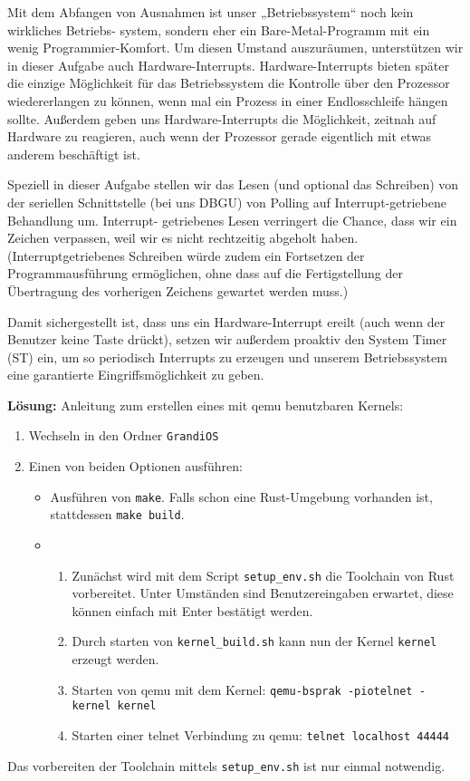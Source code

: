 \begin{description}

Mit dem Abfangen von Ausnahmen ist unser „Betriebssystem“ noch kein wirkliches Betriebs-
system, sondern eher ein Bare-Metal-Programm mit ein wenig Programmier-Komfort. Um 
diesen Umstand auszuräumen, unterstützen wir in dieser Aufgabe auch Hardware-Interrupts. 
Hardware-Interrupts bieten später die einzige Möglichkeit für das Betriebssystem die Kontrolle 
über den Prozessor wiedererlangen zu können, wenn mal ein Prozess in einer Endlosschleife 
hängen sollte. Außerdem geben uns Hardware-Interrupts die Möglichkeit, zeitnah auf Hardware 
zu reagieren, auch wenn der Prozessor gerade eigentlich mit etwas anderem beschäftigt ist. 

Speziell in dieser Aufgabe stellen wir das Lesen (und optional das Schreiben) von der seriellen 
Schnittstelle (bei uns DBGU) von Polling auf Interrupt-getriebene Behandlung um. Interrupt-
getriebenes Lesen verringert die Chance, dass wir ein Zeichen verpassen, weil wir es nicht 
rechtzeitig abgeholt haben. (Interruptgetriebenes Schreiben würde zudem ein Fortsetzen der 
Programmausführung ermöglichen, ohne dass auf die Fertigstellung der Übertragung des 
vorherigen Zeichens gewartet werden muss.) 

Damit sichergestellt ist, dass uns ein Hardware-Interrupt ereilt (auch wenn der Benutzer keine 
Taste drückt), setzen wir außerdem proaktiv den System Timer (ST) ein, um so periodisch 
Interrupts zu erzeugen und unserem Betriebssystem eine garantierte Eingriffsmöglichkeit zu 
geben. 
  

\pagebreak
\textbf{Lösung:}
Anleitung zum erstellen eines mit qemu benutzbaren Kernels:
\begin{enumerate}
	\item Wechseln in den Ordner \texttt{GrandiOS}
        \item Einen von beiden Optionen ausführen:
          \begin{itemize}
            \item Ausführen von \texttt{make}. Falls schon eine Rust-Umgebung vorhanden ist, stattdessen \texttt{make build}.
            \item \begin{enumerate}
              \item Zunächst wird mit dem Script \texttt{setup\_env.sh} die Toolchain von Rust vorbereitet. Unter Umständen sind Benutzereingaben erwartet, diese können einfach mit Enter bestätigt werden.
              \item Durch starten von \texttt{kernel\_build.sh} kann nun der Kernel \texttt{kernel} erzeugt werden.
              \item Starten von qemu mit dem Kernel: \texttt{qemu-bsprak -piotelnet -kernel kernel}
              \item Starten einer telnet Verbindung zu qemu: \texttt{telnet localhost 44444}
            \end{enumerate}
          \end{itemize}
\end{enumerate}
Das vorbereiten der Toolchain mittels \texttt{setup\_env.sh} ist nur einmal notwendig.


\end{description}

